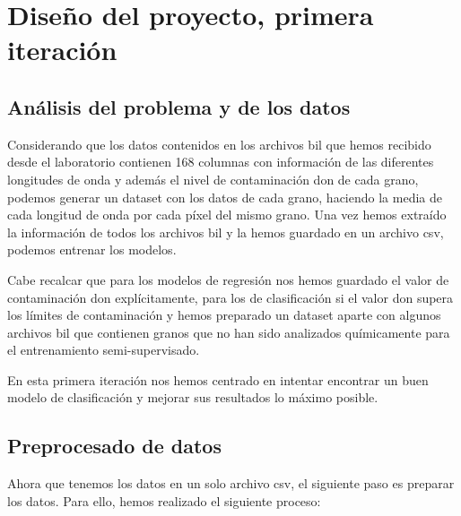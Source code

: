 \section{Diseño del proyecto, primera iteración}

\subsection{Análisis del problema y de los datos}
\label{sec:obtencion}

Considerando que los datos contenidos en los archivos \acrshort{bil} que hemos recibido desde el laboratorio contienen 168 columnas con información de las diferentes longitudes de onda \cite{WhatIsHy18:online} y además el nivel de contaminación \gls{don} de cada grano, podemos generar un \gls{dataset} con los datos de cada grano, haciendo la media de cada longitud de onda por cada píxel del mismo grano. Una vez hemos extraído la información de todos los archivos \acrshort{bil} y la hemos guardado en un archivo \acrshort{csv}, podemos entrenar los modelos.

Cabe recalcar que para los modelos de regresión nos hemos guardado el valor de contaminación \gls{don} explícitamente, para los de clasificación si el valor \gls{don} supera los límites de contaminación y hemos preparado un \gls{dataset} aparte con algunos archivos \gls{bil} que contienen granos que no han sido analizados químicamente para el entrenamiento semi-supervisado.

En esta primera iteración nos hemos centrado en intentar encontrar un buen modelo de clasificación y mejorar sus resultados lo máximo posible.

\subsection{Preprocesado de datos}
\label{sec:preprocesado}

Ahora que tenemos los datos en un solo archivo \acrshort{csv}, el siguiente paso es preparar los datos. Para ello, hemos realizado el siguiente proceso: 

